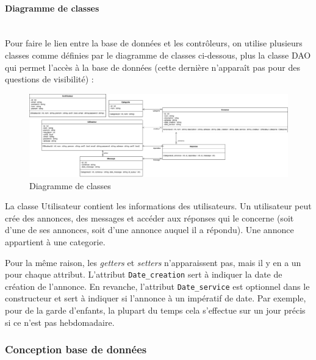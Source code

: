 \documentclass[a4paper,11pt]{article}
\begin{document}
\paragraph{Diagramme de classes}\mbox{} \\

Pour faire le lien entre la base de données et les contrôleurs, on utilise plusieurs classes comme définies par le diagramme de classes ci-dessous,
plus la classe DAO qui permet l'accès à la base de données (cette dernière n'apparaît pas pour des questions de visibilité) :\\

\begin{figure}[H]
  \includegraphics[width=\linewidth]{../Conception/PHP/DC.png}
  \caption{Diagramme de classes}
  \label{fig:diagramme-classe-php}
\end{figure}

La classe Utilisateur contient les informations des utilisateurs. Un utilisateur peut crée des annonces, des messages et accéder aux réponses qui le concerne (soit d'une de ses annonces, soit d'une annonce auquel il a répondu).
Une annonce appartient à une categorie.

Pour la même raison, les \textit{getters} et \textit{setters} n'apparaissent pas, mais il y en a un pour chaque attribut.
L'attribut \texttt{Date\_creation} sert à indiquer la date de création de l'annonce.
En revanche, l'attribut \texttt{Date\_service} est optionnel dans le constructeur et sert à indiquer si l'annonce à un impératif de date.
Par exemple, pour de la garde d'enfants, la plupart du temps cela s'effectue sur un jour précis si ce n'est pas hebdomadaire.\\

\subsubsection{Conception base de données}
\end{document}
